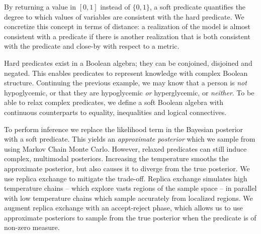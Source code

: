By returning a value in $[0, 1]$ instead of $\{0, 1\}$, a soft predicate quantifies the degree to which values of variables are consistent with the hard predicate.
We concretize this concept in terms of distance: a realization of the model is almost consistent with a predicate if there is another realization that is both consistent with the predicate and close-by with respect to a metric.

Hard predicates exist in a Boolean algebra; they can be conjoined, disjoined and negated.
This enables predicates to represent knowledge with complex Boolean structure.
Continuing the previous example, we may know that a person is \emph{not} hypoglycemic, or that they are hypoglycemic \emph{or} hyperglycemic, or \emph{neither}.
To be able to relax complex predicates, we define a soft Boolean algebra with continuous counterparts to equality, inequalities and logical connectives.

To perform inference we replace the likelihood term in the Bayesian posterior with a soft predicate.
This yields an \emph{approximate posterior} which we sample from using Markov Chain Monte Carlo.
However, relaxed predicates can still induce complex, multimodal posteriors.
Increasing the temperature smooths the approximate posterior, but also causes it to diverge from the true posterior.
We use replica exchange to mitigate the trade-off. 
Replica exchange simulates high temperature chains -- which explore vasts regions of the sample space -- in parallel with low temperature chains which sample accurately from localized regions.
We augment replica exchange with an accept-reject phase, which allows us to use approximate posteriors to sample from the true posterior when the predicate is of non-zero measure.




